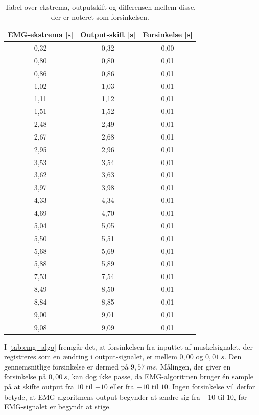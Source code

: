 \begin{table}[H]
\centering
\begin{tabular}{|c|c|c|}
\hline 
\textbf{EMG-ekstrema [s]} & \textbf{Output-skift [s]} & \textbf{Forsinkelse [s]}\\ 
\hline 
0,32 & 0,32 & 0,00\\ 
\hline 
0,80 & 0,80 & 0,01\\ 
\hline 
0,86 & 0,86 & 0,01\\ 
\hline 
1,02 & 1,03 & 0,01\\ 
\hline 
1,11 & 1,12 & 0,01\\ 
\hline 
1,51 & 1,52 & 0,01\\ 
\hline 
2,48 & 2,49 & 0,01\\ 
\hline 
2,67 & 2,68 & 0,01\\ 
\hline 
2,95 & 2,96 & 0,01\\ 
\hline 
3,53 & 3,54 & 0,01\\ 
\hline 
3,62 & 3,63 & 0,01\\ 
\hline 
3,97 & 3,98 & 0,01\\ 
\hline 
4,33 & 4,34 & 0,01\\ 
\hline 
4,69 & 4,70 & 0,01\\ 
\hline 
5,04 & 5,05 & 0,01\\ 
\hline 
5,50 & 5,51 & 0,01\\ 
\hline 
5,68 & 5,69 & 0,01\\ 
\hline 
5,88 & 5,89 & 0,01\\ 
\hline 
7,53 & 7,54 & 0,01\\ 
\hline 
8,49 & 8,50 & 0,01\\ 
\hline 
8,84 & 8,85 & 0,01\\ 
\hline 
9,00 & 9,01 & 0,01\\ 
\hline 
9,08 & 9,09 & 0,01\\ 
\hline 
\end{tabular} 
\caption{Tabel over ekstrema, outputskift og differensen mellem disse, der er noteret som forsinkelsen.}
\label{tab:emg_algo}
\end{table}

\noindent
I \autoref{tab:emg_algo} fremgår det, at forsinkelsen fra inputtet af muskelsignalet, der registreres som en ændring i output-signalet, er mellem $0,00$ og $0,01~s$. Den gennemsnitlige forsinkelse er dermed på $9,57~ms$. Målingen, der giver en forsinkelse på $0,00~s$, kan dog ikke passe, da EMG-algoritmen bruger én sample på at skifte output fra $10$ til $-10$ eller fra $-10$ til $10$. Ingen forsinkelse vil derfor betyde, at EMG-algoritmens output begynder at ændre sig fra $-10$ til $10$, før EMG-signalet er begyndt at stige. 

